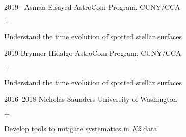 \documentclass[]{luger-cv} %
\begin{document}
\begin{entrylist}
        \entry
        {2019--}
        {Asmaa Elsayed}
        {AstroCom Program, CUNY/CCA}
        {%
            \vspace{-1em}
            \begin{list}{$+$}{\cvlist}
                \item Understand the time evolution of spotted stellar surfaces
            \end{list}
        }

        \entry
        {2019}
        {Brynner Hidalgo}
        {AstroCom Program, CUNY/CCA}
        {%
            \vspace{-1em}
            \begin{list}{$+$}{\cvlist}
                \item Understand the time evolution of spotted stellar surfaces
            \end{list}
        }

        \entry
        {2016--2018}
        {Nicholas Saunders}
        {University of Washington}
        {%
            \vspace{-1em}
            \begin{list}{$+$}{\cvlist}
                \item Develop tools to mitigate systematics in \emph{K2} data
            \end{list}
        }


    \end{entrylist}
\fi

\clearpage


\ifdefined \withother
\end{document}

